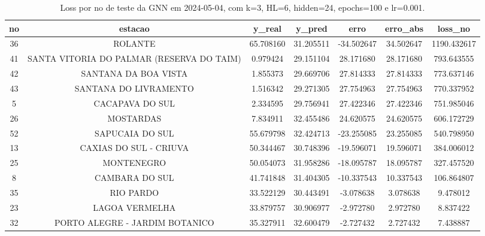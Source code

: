 \begin{table}[h]
\centering
\caption{Loss por no de teste da GNN em 2024-05-04, com k=3, HL=6, hidden=24, epochs=100 e lr=0.001.}
\label{tab:gnn_loss_k3_hl6_h24_e100_d20240504}
\begin{tabular}{ccccccc}
\toprule
no & estacao & y\_real & y\_pred & erro & erro\_abs & loss\_no \\
\midrule
36 & ROLANTE & 65.708160 & 31.205511 & -34.502647 & 34.502647 & 1190.432617 \\
41 & SANTA VITORIA DO PALMAR (RESERVA DO TAIM) & 0.979424 & 29.151104 & 28.171680 & 28.171680 & 793.643555 \\
42 & SANTANA DA BOA VISTA & 1.855373 & 29.669706 & 27.814333 & 27.814333 & 773.637146 \\
43 & SANTANA DO LIVRAMENTO & 1.516342 & 29.271305 & 27.754963 & 27.754963 & 770.337952 \\
5 & CACAPAVA DO SUL & 2.334595 & 29.756941 & 27.422346 & 27.422346 & 751.985046 \\
26 & MOSTARDAS & 7.834911 & 32.455486 & 24.620575 & 24.620575 & 606.172729 \\
52 & SAPUCAIA DO SUL & 55.679798 & 32.424713 & -23.255085 & 23.255085 & 540.798950 \\
13 & CAXIAS DO SUL - CRIUVA & 50.344467 & 30.748396 & -19.596071 & 19.596071 & 384.006012 \\
25 & MONTENEGRO & 50.054073 & 31.958286 & -18.095787 & 18.095787 & 327.457520 \\
8 & CAMBARA DO SUL & 41.741848 & 31.404305 & -10.337543 & 10.337543 & 106.864807 \\
35 & RIO PARDO & 33.522129 & 30.443491 & -3.078638 & 3.078638 & 9.478012 \\
23 & LAGOA VERMELHA & 33.879757 & 30.906977 & -2.972780 & 2.972780 & 8.837422 \\
32 & PORTO ALEGRE - JARDIM BOTANICO & 35.327911 & 32.600479 & -2.727432 & 2.727432 & 7.438887 \\
\bottomrule
\end{tabular}
\end{table}

